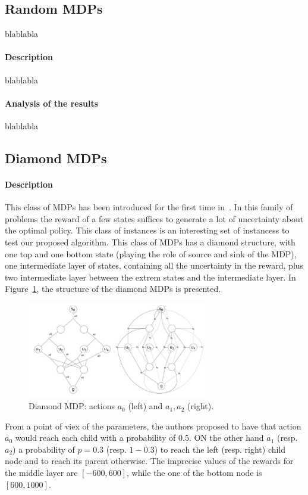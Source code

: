\subsection{Random MDPs}
blablabla
\paragraph{Description}
blablabla
\paragraph{Analysis of the results}
blablabla


\subsection{Diamond MDPs}
\paragraph{Description}
This class of MDPs has been introduced for the first time in~\cite{benavent2018}. 
In this family of problems the reward of a few states suffices to generate a lot of uncertainty about the optimal policy. This class of instances is an interesting set of instancess to test our proposed algorithm.
This class of MDPs has a diamond structure, with one top and one bottom state (playing the role of source and sink of the  MDP), one intermediate layer of states, containing all the uncertainty in the reward, plus two intermediate layer between the extrem states and the intermediate layer.
In Figure~\ref{fig:diamond}, the structure of the diamond MDPs is presented.

\begin{figure}[h]
\begin{center}
\includegraphics[width=8cm]{diamond.png}
\end{center}
\caption{Diamond MDP: actions $a_0$ (left) and $a_1, a_2$ (right).}
\label{fig:diamond}
\end{figure}

From a point of viex of the parameters, the authors proposed to have that action $a_0$ would reach each child with a probability of $0.5$. ON the other hand $a_1$ (resp. $a_2$) a probability of $p= 0.3$ (resp. $1-0.3$) to reach the left (resp. right) child node and to reach its parent otherwise.
The imprecise values of the rewards for the middle layer are $[-600,600]$, while the one of the bottom node is $[600,1000]$.


